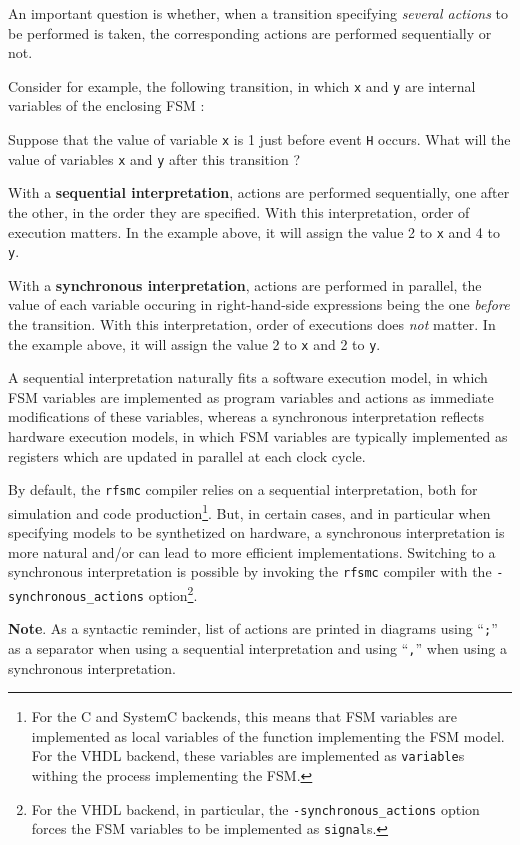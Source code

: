 An important question is whether, when a transition specifying \emph{several actions} to be
performed is taken, the corresponding actions are performed sequentially or not. 

Consider for example, the following transition, in which \verb|x| and \verb|y| are internal
variables of the enclosing FSM :

\begin{center}
\end{center}

Suppose that the value of variable \verb|x| is 1 just before event \verb|H| occurs. What will the value of
variables \verb|x| and \verb|y| after this transition ?

\step With a \textbf{sequential interpretation}, actions are performed sequentially, one after the
other, in the order they are specified. With this interpretation, order of execution matters. In the example above, it will
assign the value 2 to \verb|x| and 4 to \verb|y|.

\step With a \textbf{synchronous interpretation}, actions are performed in parallel, the value of each variable
occuring in right-hand-side expressions being the one \emph{before} the transition. With this
interpretation, order of executions does \emph{not} matter. In the example above, it will
assign the value 2 to \verb|x| and 2 to \verb|y|.

\medskip
A sequential interpretation naturally fits a software execution model, in which FSM variables are
implemented as program variables and actions as immediate modifications of these variables, whereas
a synchronous interpretation reflects hardware execution models, in which FSM variables are
typically implemented as registers which are updated in parallel at each clock cycle.

\medskip
By default, the \verb|rfsmc| compiler relies on a sequential interpretation, both for simulation and
code production\footnote{For the C and SystemC backends, this means that FSM variables are
  implemented as local variables of the function implementing the FSM model. For the VHDL backend,
  these variables are implemented as \texttt{variable}s withing the process implementing the
  FSM.}. But, in certain cases, and in particular when specifying models to be synthetized on
hardware, a synchronous interpretation is more natural and/or can lead to more efficient
implementations. Switching to a synchronous interpretation is possible by invoking the \verb|rfsmc|
compiler with the \verb|-synchronous_actions| option\footnote{For the VHDL backend, in particular, the
  \texttt{-synchronous\_actions} option forces the FSM variables to be implemented as
  \texttt{signal}s.}.  

\medskip
\textbf{Note}. As a syntactic reminder, list of actions are printed in diagrams using ``\verb|;|'' as a separator when using
a sequential interpretation and using ``\verb|,|'' when using a synchronous interpretation.


